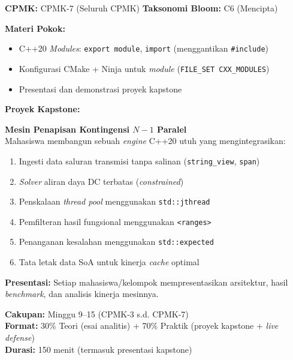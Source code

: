 \documentclass[12pt,a4paper]{article}
\begin{document}
\begin{tcolorbox}[colback=white, colframe=uniblue, title={\textbf{Minggu 15: C++20 \textit{Modules} \& Proyek Kapstone}}, fonttitle=\bfseries\color{white}, coltitle=white, colbacktitle=uniblue]
\textbf{CPMK:} CPMK-7 (Seluruh CPMK) \hfill \textbf{Taksonomi Bloom:} C6 (Mencipta)

\textbf{Materi Pokok:}
\begin{itemize}[nosep]
    \item C++20 \textit{Modules}: \texttt{export module}, \texttt{import} (menggantikan \texttt{\#include})
    \item Konfigurasi CMake + Ninja untuk \textit{module} (\texttt{FILE\_SET CXX\_MODULES})
    \item Presentasi dan demonstrasi proyek kapstone
\end{itemize}

\textbf{Proyek Kapstone:}

\begin{tcolorbox}[colback=lightblue, colframe=uniblue!70]
\textbf{Mesin Penapisan Kontingensi $N-1$ Paralel}\\[0.2cm]
Mahasiswa membangun sebuah \textit{engine} C++20 utuh yang mengintegrasikan:
\begin{enumerate}[nosep]
    \item Ingesti data saluran transmisi tanpa salinan (\texttt{string\_view}, \texttt{span})
    \item \textit{Solver} aliran daya DC terbatas (\textit{constrained})
    \item Penskalaan \textit{thread pool} menggunakan \texttt{std::jthread}
    \item Pemfilteran hasil fungsional menggunakan \texttt{<ranges>}
    \item Penanganan kesalahan menggunakan \texttt{std::expected}
    \item Tata letak data SoA untuk kinerja \textit{cache} optimal
\end{enumerate}
\end{tcolorbox}

\textbf{Presentasi:}
Setiap mahasiswa/kelompok mempresentasikan arsitektur, hasil \textit{benchmark}, dan analisis kinerja mesinnya.
\end{tcolorbox}

\begin{tcolorbox}[colback=lightgray, colframe=gray, title={\textbf{Minggu 16: UJIAN AKHIR SEMESTER (UAS)}}, fonttitle=\bfseries]
\textbf{Cakupan:} Minggu 9--15 (CPMK-3 s.d. CPMK-7) \\
\textbf{Format:} 30\% Teori (esai analitis) + 70\% Praktik (proyek kapstone + \textit{live defense}) \\
\textbf{Durasi:} 150 menit (termasuk presentasi kapstone)
\end{tcolorbox}
\end{document}
